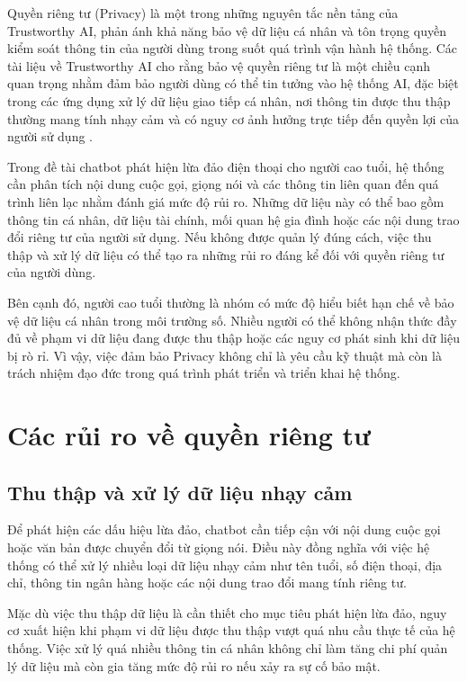Quyền riêng tư (Privacy) là một trong những nguyên tắc nền tảng của Trustworthy AI, phản ánh khả năng bảo vệ dữ liệu cá nhân và tôn trọng quyền kiểm soát thông tin của người dùng trong suốt quá trình vận hành hệ thống. Các tài liệu về Trustworthy AI cho rằng bảo vệ quyền riêng tư là một chiều cạnh quan trọng nhằm đảm bảo người dùng có thể tin tưởng vào hệ thống AI, đặc biệt trong các ứng dụng xử lý dữ liệu giao tiếp cá nhân, nơi thông tin được thu thập thường mang tính nhạy cảm và có nguy cơ ảnh hưởng trực tiếp đến quyền lợi của người sử dụng \cite{li2021_trustworthyai, leschanowsky2024_privacytrustcai}.

Trong đề tài chatbot phát hiện lừa đảo điện thoại cho người cao tuổi, hệ thống cần phân tích nội dung cuộc gọi, giọng nói và các thông tin liên quan đến quá trình liên lạc nhằm đánh giá mức độ rủi ro. Những dữ liệu này có thể bao gồm thông tin cá nhân, dữ liệu tài chính, mối quan hệ gia đình hoặc các nội dung trao đổi riêng tư của người sử dụng. Nếu không được quản lý đúng cách, việc thu thập và xử lý dữ liệu có thể tạo ra những rủi ro đáng kể đối với quyền riêng tư của người dùng.

Bên cạnh đó, người cao tuổi thường là nhóm có mức độ hiểu biết hạn chế về bảo vệ dữ liệu cá nhân trong môi trường số. Nhiều người có thể không nhận thức đầy đủ về phạm vi dữ liệu đang được thu thập hoặc các nguy cơ phát sinh khi dữ liệu bị rò rỉ. Vì vậy, việc đảm bảo Privacy không chỉ là yêu cầu kỹ thuật mà còn là trách nhiệm đạo đức trong quá trình phát triển và triển khai hệ thống.

\section{Các rủi ro về quyền riêng tư}
\subsection{Thu thập và xử lý dữ liệu nhạy cảm}
Để phát hiện các dấu hiệu lừa đảo, chatbot cần tiếp cận với nội dung cuộc gọi hoặc văn bản được chuyển đổi từ giọng nói. Điều này đồng nghĩa với việc hệ thống có thể xử lý nhiều loại dữ liệu nhạy cảm như tên tuổi, số điện thoại, địa chỉ, thông tin ngân hàng hoặc các nội dung trao đổi mang tính riêng tư.

Mặc dù việc thu thập dữ liệu là cần thiết cho mục tiêu phát hiện lừa đảo, nguy cơ xuất hiện khi phạm vi dữ liệu được thu thập vượt quá nhu cầu thực tế của hệ thống. Việc xử lý quá nhiều thông tin cá nhân không chỉ làm tăng chi phí quản lý dữ liệu mà còn gia tăng mức độ rủi ro nếu xảy ra sự cố bảo mật.

